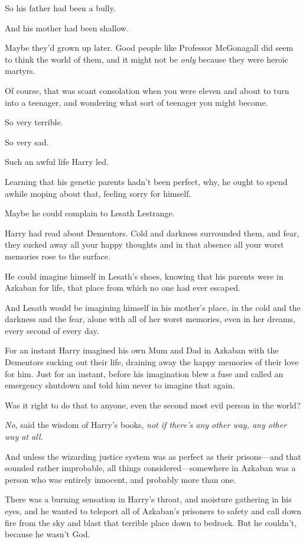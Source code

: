 So his father had been a bully.

And his mother had been shallow.

Maybe they'd grown up later. Good people like Professor McGonagall did seem to
think the world of them, and it might not be \emph{only} because they were
heroic martyrs.

Of course, that was scant consolation when you were eleven and about to turn
into a teenager, and wondering what sort of teenager you might become.

So very terrible.

So very sad.

Such an awful life Harry led.

Learning that his genetic parents hadn't been perfect, why, he ought to spend
awhile moping about that, feeling sorry for himself.

Maybe he could complain to Lesath Lestrange.

Harry had read about Dementors. Cold and darkness surrounded them, and fear,
they sucked away all your happy thoughts and in that absence all your worst
memories rose to the surface.

He could imagine himself in Lesath's shoes, knowing that his parents were in
Azkaban for life, that place from which no one had ever escaped.

And Lesath would be imagining himself in his mother's place, in the cold and
the darkness and the fear, alone with all of her worst memories, even in her
dreams, every second of every day.

For an instant Harry imagined his own Mum and Dad in Azkaban with the Dementors
sucking out their life, draining away the happy memories of their love for him.
Just for an instant, before his imagination blew a fuse and called an emergency
shutdown and told him never to imagine that again.

Was it right to do that to anyone, even the second most evil person in the
world?

\emph{No,} said the wisdom of Harry's books, \emph{not if there's any other
way, any other way at all.}

And unless the wizarding justice system was as perfect as their prisons---and
that sounded rather improbable, all things considered---somewhere in Azkaban
was a person who was entirely innocent, and probably more than one.

There was a burning sensation in Harry's throat, and moisture gathering in his
eyes, and he wanted to teleport all of Azkaban's prisoners to safety and call
down fire from the sky and blast that terrible place down to bedrock. But he
couldn't, because he wasn't God.

